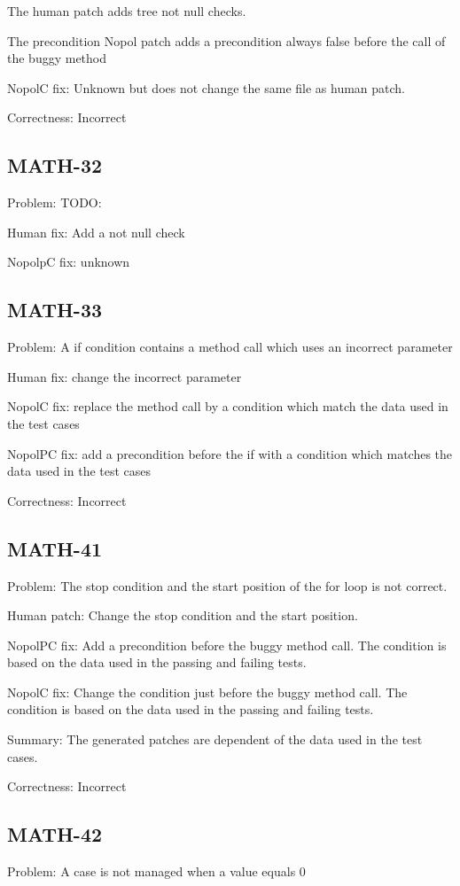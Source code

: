 \documentclass{article}
\newcommand{\todo}[1]{{\color{red}TODO: #1}}
\begin{document}
The human patch adds tree not null checks.

The precondition Nopol patch adds a precondition always false before the call of the buggy method

NopolC fix: Unknown but does not change the same file as human patch.

Correctness: Incorrect

\subsection{MATH-32}
Problem: \todo{}

Human fix: Add a not null check

NopolpC fix: unknown

\subsection{MATH-33}
Problem: A if condition contains a method call which uses an incorrect parameter

Human fix: change the incorrect parameter

NopolC fix: replace the method call by a condition which match the data used in the test cases

NopolPC fix: add a precondition before the if with a condition which matches the data used in the test cases

Correctness: Incorrect

\subsection{MATH-41}
Problem: The stop condition and the start position of the for loop is not correct.

Human patch: Change the stop condition and the start position.

NopolPC fix: Add a precondition before the buggy method call. The condition is based on the data used in the passing and failing tests. 

NopolC fix: Change the condition just before the buggy method call. The condition is based on the data used in the passing and failing tests.

Summary: The generated patches are dependent of the data used in the test cases.

Correctness: Incorrect

\subsection{MATH-42}
Problem: A case is not managed when a value equals 0
\end{document}
